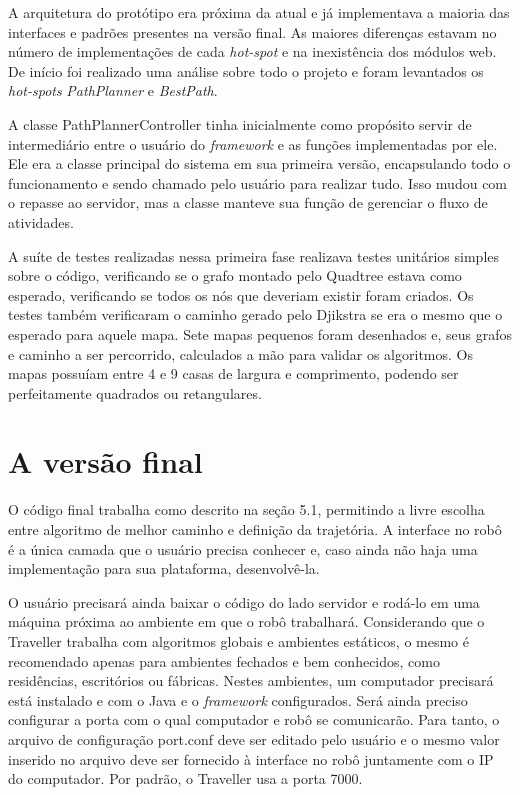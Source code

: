 A arquitetura do protótipo era próxima da atual e já implementava a maioria das interfaces e padrões presentes na versão final. As maiores diferenças estavam no número de implementações de cada \textit{hot-spot} e na inexistência dos módulos web. De início foi realizado uma análise sobre todo o projeto e foram levantados os \textit{hot-spots} \textit{PathPlanner} e \textit{BestPath}. 

A classe PathPlannerController tinha inicialmente como propósito servir de intermediário entre o usuário do \textit{framework} e as funções implementadas por ele. Ele era a classe principal do sistema em sua primeira versão, encapsulando todo o funcionamento e sendo chamado pelo usuário para realizar tudo. Isso mudou com o repasse ao servidor, mas a classe manteve sua função de gerenciar o fluxo de atividades.

A suíte de testes realizadas nessa primeira fase realizava testes unitários simples sobre o código, verificando se o grafo montado pelo Quadtree estava como esperado, verificando se todos os nós que deveriam existir foram criados. Os testes também verificaram o caminho gerado pelo Djikstra se era o mesmo que o esperado para aquele mapa. Sete mapas pequenos foram desenhados e, seus grafos e caminho a ser percorrido, calculados a mão para validar os algoritmos. Os mapas possuíam entre 4 e 9 casas de largura e comprimento, podendo ser perfeitamente quadrados ou retangulares.

\section{A versão final}

O código final trabalha como descrito na seção 5.1, permitindo a livre escolha entre algoritmo de melhor caminho e definição da trajetória. A interface no robô é a única camada que o usuário precisa conhecer e, caso ainda não haja uma implementação para sua plataforma, desenvolvê-la.

O usuário precisará ainda baixar o código do lado servidor e rodá-lo em uma máquina próxima ao ambiente em que o robô trabalhará. Considerando que o Traveller trabalha com algoritmos globais e ambientes estáticos, o mesmo é recomendado apenas para ambientes fechados e bem conhecidos, como residências, escritórios ou fábricas. Nestes ambientes, um computador precisará está instalado e com o Java e o \textit{framework} configurados. Será ainda preciso configurar a porta com o qual computador e robô se comunicarão. Para tanto, o arquivo de configuração port.conf deve ser editado pelo usuário e o mesmo valor inserido no arquivo deve ser fornecido à interface no robô juntamente com o IP do computador. Por padrão, o Traveller usa a porta 7000.

